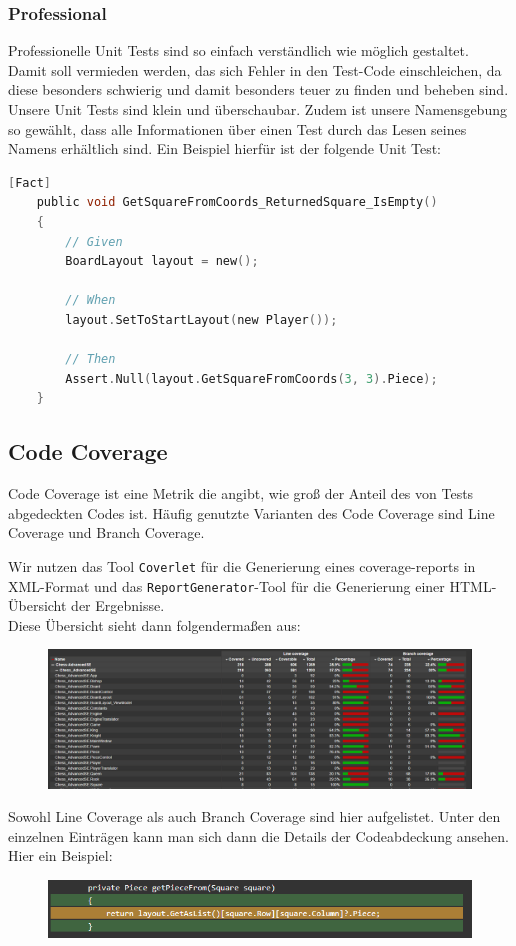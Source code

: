 \documentclass[
10pt, %
a4paper, %
oneside, %
headinclude,footinclude, %
BCOR5mm, %
]{scrartcl}
\begin{document}
\begin{onehalfspace}
\subsubsection{Professional}
Professionelle Unit Tests sind so einfach verständlich wie möglich gestaltet. Damit soll vermieden werden, das sich Fehler in den Test-Code einschleichen, da diese besonders schwierig und damit besonders teuer zu finden und beheben sind.
Unsere Unit Tests sind klein und überschaubar. Zudem ist unsere Namensgebung so gewählt, dass alle Informationen über einen Test durch das Lesen seines Namens erhältlich sind. Ein Beispiel hierfür ist der folgende Unit Test:
\begin{lstlisting}[language=c, style=mStyle]
	[Fact]
	public void GetSquareFromCoords_ReturnedSquare_IsEmpty()
	{
		// Given
		BoardLayout layout = new();

		// When
		layout.SetToStartLayout(new Player());
		
		// Then
		Assert.Null(layout.GetSquareFromCoords(3, 3).Piece);
	}
\end{lstlisting}

\subsection{Code Coverage}
Code Coverage ist eine Metrik die angibt, wie 
groß der Anteil des von Tests abgedeckten Codes ist. Häufig genutzte Varianten des Code Coverage sind Line Coverage und Branch Coverage.

Wir nutzen das Tool \texttt{Coverlet} für die Generierung eines coverage-reports in XML-Format und das \texttt{ReportGenerator}-Tool für die Generierung einer HTML-Übersicht der Ergebnisse.
\\
Diese Übersicht sieht dann folgendermaßen aus:
\begin{figure}[ht!]
	\includegraphics[width=\linewidth]{coveragereport}
\end{figure}

Sowohl Line Coverage als auch Branch Coverage sind hier aufgelistet. Unter den einzelnen Einträgen kann man sich dann die Details der Codeabdeckung ansehen.
Hier ein Beispiel:
\begin{figure}[ht!]
	\includegraphics[width=\linewidth]{methodcovered}
\end{figure}


\end{onehalfspace}
\end{document}
